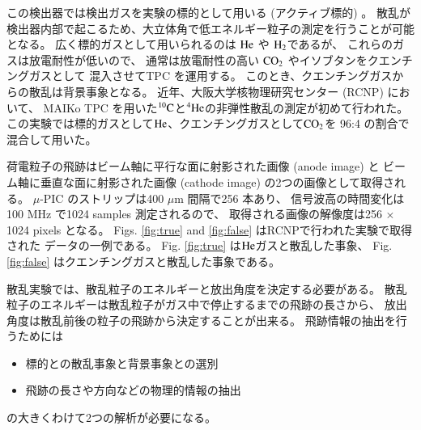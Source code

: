 \documentclass{jps-cp}
\begin{document}
この検出器では検出ガスを実験の標的として用いる (アクティブ標的) 。
散乱が検出器内部で起こるため、大立体角で低エネルギー粒子の測定を行うことが可能となる。
広く標的ガスとして用いられるのは $\rm{He}$ や $\rm{H}_{2}$であるが、
これらのガスは放電耐性が低いので、
通常は放電耐性の高い $\rm{CO}_{2}$ やイソブタンをクエンチングガスとして
混入させてTPC を運用する。
このとき、クエンチングガスからの散乱は背景事象となる。
近年、大阪大学核物理研究センター (RCNP) において、
MAIKo TPC を用いた${}^{10}\rm{C}$と${}^{4}\rm{He}$の非弾性散乱の測定が初めて行われた。
この実験では標的ガスとして$\rm{He}$、クエンチングガスとして$\rm{CO}_{2}$を
96:4 の割合で混合して用いた。

荷電粒子の飛跡はビーム軸に平行な面に射影された画像 (anode image) と
ビーム軸に垂直な面に射影された画像 (cathode image) の2つの画像として取得される。
$\mu$-PIC のストリップは400 $\mu$m 間隔で256 本あり、
信号波高の時間変化は100 MHz で1024 samples 測定されるので、
取得される画像の解像度は256 $\times$ 1024 pixels となる。
Figs. \ref{fig:true} and \ref{fig:false} はRCNPで行われた実験で取得された
データの一例である。
Fig. \ref{fig:true} は$\rm{He}$ガスと散乱した事象、
Fig. \ref{fig:false} はクエンチングガスと散乱した事象である。

散乱実験では、散乱粒子のエネルギーと放出角度を決定する必要がある。
散乱粒子のエネルギーは散乱粒子がガス中で停止するまでの飛跡の長さから、
放出角度は散乱前後の粒子の飛跡から決定することが出来る。
飛跡情報の抽出を行うためには
\begin{itemize}
\item 標的との散乱事象と背景事象との選別
\item 飛跡の長さや方向などの物理的情報の抽出
\end{itemize}
の大きくわけて2つの解析が必要になる。
\end{document}
